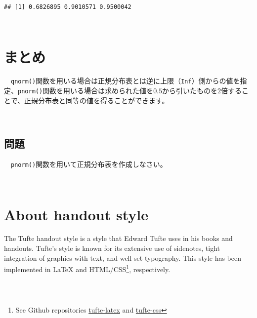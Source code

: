 \documentclass[]{tufte-handout}
\begin{document}
\begin{verbatim}
## [1] 0.6826895 0.9010571 0.9500042
\end{verbatim}

　

\hypertarget{ux307eux3068ux3081}{%
\section{まとめ}\label{ux307eux3068ux3081}}

　\texttt{qnorm()}関数を用いる場合は正規分布表とは逆に上限（\texttt{Inf}）側からの値を指定、\texttt{pnorm()}関数を用いる場合は求められた値を\(0.5\)から引いたものを\(2\)倍することで、正規分布表と同等の値を得ることができます。

　

\hypertarget{ux554fux984c}{%
\subsection{問題}\label{ux554fux984c}}

　\texttt{pnorm()}関数を用いて正規分布表を作成しなさい。

　

\hypertarget{about-handout-style}{%
\section{About handout style}\label{about-handout-style}}

The Tufte handout style is a style that Edward Tufte uses in his books
and handouts. Tufte's style is known for its extensive use of sidenotes,
tight integration of graphics with text, and well-set typography. This
style has been implemented in LaTeX and HTML/CSS\footnote{See Github
  repositories
  \href{https://github.com/tufte-latex/tufte-latex}{tufte-latex} and
  \href{https://github.com/edwardtufte/tufte-css}{tufte-css}},
respectively.

　


\end{document}
